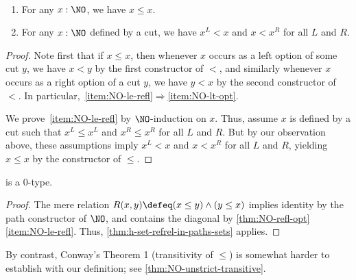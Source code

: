 \begin{thm}\label{thm:NO-refl-opt}\
  \begin{enumerate}
  \item For any $x:\NO$, we have $x\le x$.\label{item:NO-le-refl}
  \item For any $x:\NO$ defined by a cut, we have $x^L <x$ and $x<x^R$ for all $L$ and $R$.\label{item:NO-lt-opt}
  \end{enumerate}
\end{thm}
\begin{proof}
  Note first that if $x\le x$, then whenever $x$ occurs as a left option of some cut $y$, we have $x<y$ by the first constructor of $<$, and similarly whenever $x$ occurs as a right option of a cut $y$, we have $y<x$ by the second constructor of $<$.
  In particular,~\ref{item:NO-le-refl}$\Rightarrow$\ref{item:NO-lt-opt}.

  We prove~\ref{item:NO-le-refl} by $\NO$-induction on $x$.
  Thus, assume $x$ is defined by a cut such that $x^L\le x^L$ and $x^R \le x^R$ for all $L$ and $R$.
  But by our observation above, these assumptions imply $x^L<x$ and $x<x^R$ for all $L$ and $R$, yielding $x\le x$ by the constructor of $\le$.
\end{proof}

\begin{cor}\label{thm:NO-set}
  \NO is a 0-type.
\end{cor}
\begin{proof}
  The mere relation $R(x,y)\defeq (x\le y) \land (y\le x)$ implies identity by the path constructor of $\NO$, and contains the diagonal by \cref{thm:NO-refl-opt}\ref{item:NO-le-refl}.
  Thus, \cref{thm:h-set-refrel-in-paths-sets} applies.
\end{proof}

By contrast, Conway's Theorem 1 (transitivity of $\le$) is somewhat harder to establish with our definition; see \cref{thm:NO-unstrict-transitive}.



